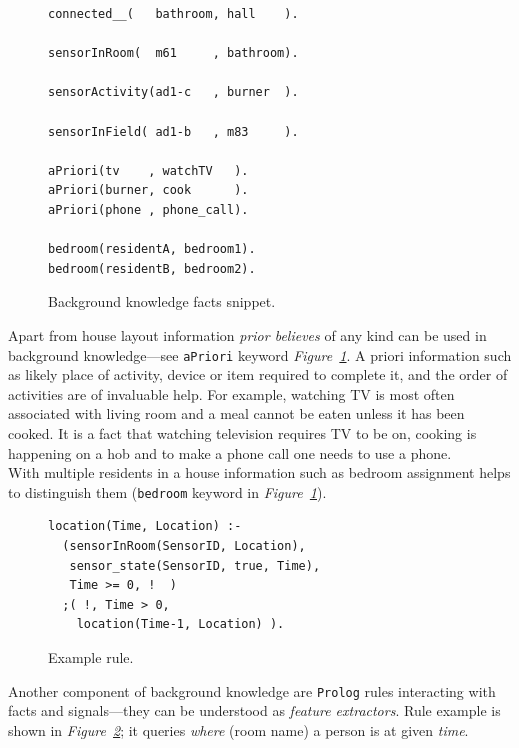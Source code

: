 \documentclass[12pt, a4paper, pdflatex, leqno, twoside, openright]{report}
\begin{document}
\begin{figure}[htb] %
  \begin{verbatim}
connected__(   bathroom, hall    ).

sensorInRoom(  m61     , bathroom).

sensorActivity(ad1-c   , burner  ).

sensorInField( ad1-b   , m83     ).

aPriori(tv    , watchTV   ).
aPriori(burner, cook      ).
aPriori(phone , phone_call).

bedroom(residentA, bedroom1).
bedroom(residentB, bedroom2).
  \end{verbatim}
  \caption{Background knowledge facts snippet.\label{lst:bg}}
\end{figure}

Apart from house layout information \emph{prior believes} of any kind can be used in background knowledge---see \texttt{aPriori} keyword \emph{Figure~\ref{lst:bg}}. A priori information such as likely place of activity, device or item required to complete it, and the order of activities are of invaluable help. For example, watching TV is most often associated with living room and a meal cannot be eaten unless it has been cooked. It is a fact that watching television requires TV to be on, cooking is happening on a hob and to make a phone call one needs to use a phone.\\
With multiple residents in a house information such as bedroom assignment helps to distinguish them (\texttt{bedroom} keyword in \emph{Figure~\ref{lst:bg}}).\\

\begin{figure}[htb] %
  \begin{verbatim}
location(Time, Location) :-
  (sensorInRoom(SensorID, Location),
   sensor_state(SensorID, true, Time),
   Time >= 0, !  )
  ;( !, Time > 0,
    location(Time-1, Location) ).
  \end{verbatim}
  \caption{Example rule.\label{lst:bg:rule}}
\end{figure}

Another component of background knowledge are \texttt{Prolog} rules interacting with facts and signals---they can be understood as \emph{feature extractors}. Rule example is shown in \emph{Figure~\ref{lst:bg:rule}}; it queries \emph{where} (room name) a person is at given \emph{time}.\\
\end{document}
